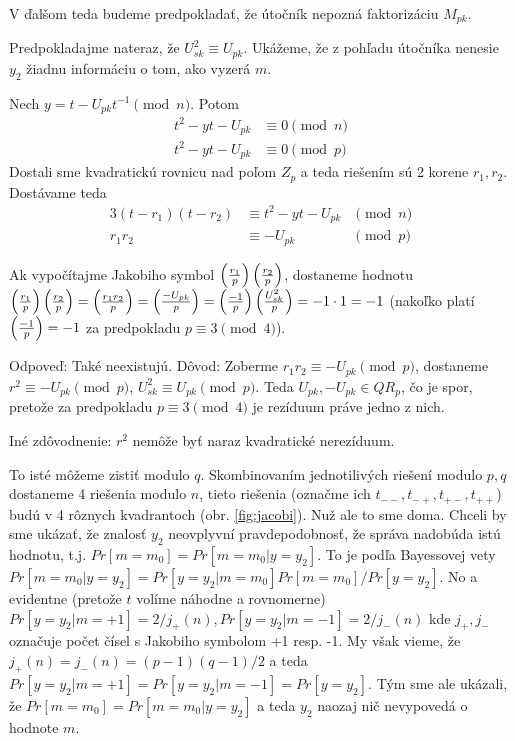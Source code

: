 V ďalšom teda budeme predpokladať, že útočník nepozná faktorizáciu $M_{pk}$.

Predpokladajme nateraz, že $U_{sk}^2 \equiv U_{pk}$.
Ukážeme, že z pohľadu útočníka nenesie $y_2$ žiadnu informáciu o tom, ako
vyzerá $m$.

Nech $y = t - U_{pk} t^{-1} \pmod{n}$.
Potom
\begin{align*}
    t^2 - y t - U_{pk} &\equiv 0 \pmod{n} \\
    t^2 - y t - U_{pk} &\equiv 0 \pmod{p}
\end{align*}
Dostali sme kvadratickú rovnicu nad poľom $Z_p$ a teda riešením sú 2 korene
$r_1,r_2$.
Dostávame teda
\begin{alignat*}{3}
    (t-r_1)(t-r_2) &\equiv t^2 - y t - U_{pk} &\pmod{n}\\
    r_1 r_2 &\equiv -U_{pk} &\pmod{p}
\end{alignat*}

Ak vypočítajme Jakobiho symbol $\left( \frac{r_1}{p} \right) \left( \frac{r_2}{p} \right)$,
dostaneme hodnotu $\left( \frac{r_1}{p} \right)\left( \frac{r_2}{p} \right) = \left( \frac{r_1 r_2}{p} \right) =
\left( \frac{-U_{pk}}{p} \right) = \left( \frac{-1}{p} \right) \left( \frac{U_{sk}^2}{p} \right)=-1\cdot 1=-1$
(nakoľko platí $\left( \frac{-1}{p} \right)=-1$ za predpokladu $p \equiv 3 \pmod{4}$).

\begin{poznamka}
    Odpoveď: Také neexistujú. Dôvod:
    Zoberme $r_1 r_2 \equiv -U_{pk} \pmod{p}$, dostaneme $r^2 \equiv
    -U_{pk} \pmod{p}$, $U_{sk}^2 \equiv U_{pk} \pmod{p}$. Teda
    $U_{pk}, -U_{pk} \in QR_p$, čo je spor, pretože za predpokladu 
    $p\equiv 3 \pmod{4}$ je rezíduum práve jedno z nich.

    Iné zdôvodnenie: $r^2$ nemôže byť naraz kvadratické nerezíduum.
\end{poznamka}

To isté môžeme zistiť modulo $q$.
Skombinovaním jednotilivých riešení modulo $p,q$ dostaneme 4 riešenia
modulo $n$, tieto riešenia (označme ich $t_{--}, t_{-+}, t_{+-},
t_{++}$) budú v 4 rôznych kvadrantoch 
(obr. \ref{fig:jacobi}). Nuž ale to sme doma.
Chceli by sme ukázať, že znalosť $y_2$ neovplyvní pravdepodobnosť, že
správa nadobúda istú hodnotu, t.j.
$Pr[m=m_0]=Pr[m=m_0 | y=y_2]$.
To je podľa Bayessovej vety
$Pr[m=m_0 | y=y_2] = Pr[y=y_2 | m=m_0] Pr[m=m_0] / Pr[y=y_2]$.
No a evidentne (pretože $t$ volíme náhodne a rovnomerne)
$Pr[y=y_2 | m=+1] =2/j_{+}(n), Pr[y=y_2 | m=-1] = 2/j_{-}(n)$
kde $j_{+},j_{-}$ označuje počet čísel s Jakobiho symbolom
+1 resp. -1. 
My však vieme, že $j_{+}(n) = j_{-}(n) = (p-1)(q-1)/2$ a teda
$Pr[y=y_2| m=+1] = Pr[y=y_2 | m=-1] = Pr[y=y_2]$. Tým sme ale ukázali,
že $Pr[m=m_0] = Pr[m=m_0 | y=y_2]$ a teda $y_2$ naozaj nič nevypovedá
o hodnote $m$.

